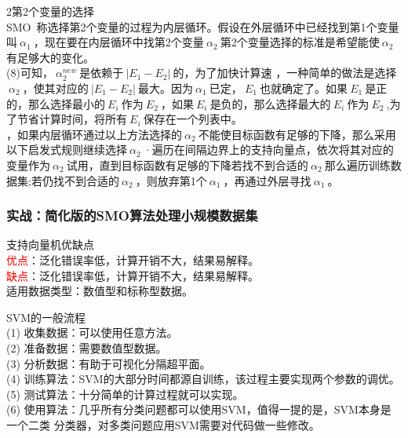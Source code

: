 \textcircled{\footnotesize{2}}第2个变量的选择 \\
\indent SMO~称选择第2个变量的过程为内层循环。假设在外层循环中已经找到第1个变量叫$~\alpha_1~$，现在要在内层循环中找第2个变量$~\alpha_2~$第2个变量选择的标准是希望能使$~\alpha_2~$有足够大的变化。\\
(8)可知，$~\alpha_2^{new}~$是依赖于$~|E_1-E_2|~$的，为了加快计算速 ，一种简单的做法是选择$~\alpha_2~$，使其对应的$~|E_1-E_2|~$最大。因为$~\alpha_1~$已定，$~E_1~$也就确定了。如果$~E_1~$是正的，那么选择最小的$~E_i~$作为$~E_2~$，如果$~E_i~$是负的，那么选择最大的$~E_i~$作为$~E_2~$,为了节省计算时间，将所有$~E_i~$保存在一个列表中。\\
，如果内层循环通过以上方法选择的$~\alpha_2~$不能使目标函数有足够的下降，那么采用以下启发式规则继续选择$~\alpha_2~$·遍历在间隔边界上的支持向量点，依次将其对应的变量作为$~\alpha_2~$试用，直到目标函数有足够的下降若找不到合适的$~\alpha_2~$那么遍历训练数据集;若仍找不到合适的$~\alpha_2~$，则放弃第1个$~\alpha_1~$，再通过外层寻找$~\alpha_1~$。
\subsubsection{实战：简化版的SMO算法处理小规模数据集}
支持向量机优缺点\\
\textcolor{red}{优点}：泛化错误率低，计算开销不大，结果易解释。\\
\textcolor{red}{缺点}：泛化错误率低，计算开销不大，结果易解释。\\
适用数据类型：数值型和标称型数据。

SVM的一般流程\\
(1) 收集数据：可以使用任意方法。 \\
(2) 准备数据：需要数值型数据。\\
(3) 分析数据：有助于可视化分隔超平面。\\
(4) 训练算法：SVM的大部分时间都源自训练，该过程主要实现两个参数的调优。\\
(5) 测试算法：十分简单的计算过程就可以实现。\\
(6) 使用算法：几乎所有分类问题都可以使用SVM，值得一提的是，SVM本身是一个二类
分类器，对多类问题应用SVM需要对代码做一些修改。\\

